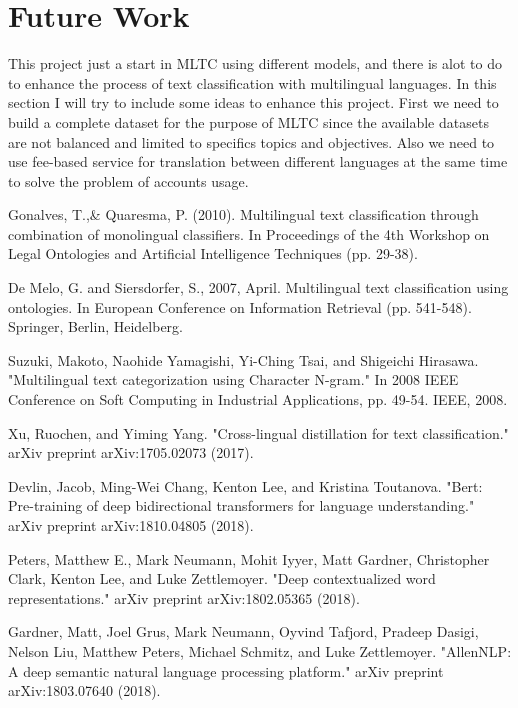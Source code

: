 \documentclass[letterpaper,12pt]{article}
\begin{document}
\section{Future Work}
This project just a start in MLTC using different models, and there is alot to do to enhance the process of text classification with multilingual languages. In this section I will try to include some ideas to enhance this project. First we need to build a complete dataset for the purpose of MLTC since the available datasets are not balanced and limited to specifics topics and objectives. Also we need to use fee-based service for translation between different languages at the same time to solve the problem of accounts usage. 





\begin{thebibliography}{}
	
Gonalves, T.,\& Quaresma, P. (2010). Multilingual text classification through combination of monolingual classifiers. In Proceedings of the 4th Workshop on Legal Ontologies and Artificial Intelligence Techniques (pp. 29-38).

De Melo, G. and Siersdorfer, S., 2007, April. Multilingual text classification using ontologies. In European Conference on Information Retrieval (pp. 541-548). Springer, Berlin, Heidelberg.

Suzuki, Makoto, Naohide Yamagishi, Yi-Ching Tsai, and Shigeichi Hirasawa. "Multilingual text categorization using Character N-gram." In 2008 IEEE Conference on Soft Computing in Industrial Applications, pp. 49-54. IEEE, 2008.

Xu, Ruochen, and Yiming Yang. "Cross-lingual distillation for text classification." arXiv preprint arXiv:1705.02073 (2017).


Devlin, Jacob, Ming-Wei Chang, Kenton Lee, and Kristina Toutanova. "Bert: Pre-training of deep bidirectional transformers for language understanding." arXiv preprint arXiv:1810.04805 (2018).

Peters, Matthew E., Mark Neumann, Mohit Iyyer, Matt Gardner, Christopher Clark, Kenton Lee, and Luke Zettlemoyer. "Deep contextualized word representations." arXiv preprint arXiv:1802.05365 (2018).

Gardner, Matt, Joel Grus, Mark Neumann, Oyvind Tafjord, Pradeep Dasigi, Nelson Liu, Matthew Peters, Michael Schmitz, and Luke Zettlemoyer. "AllenNLP: A deep semantic natural language processing platform." arXiv preprint arXiv:1803.07640 (2018).



\end{thebibliography}
\end{document}
